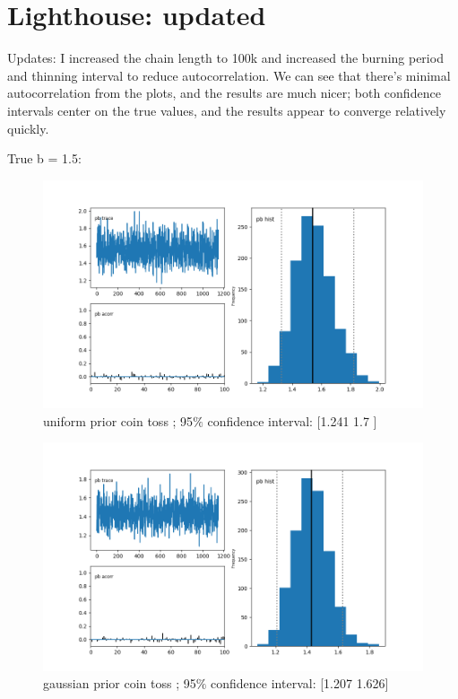 \documentclass[a4paper,11pt,english]{article}
\begin{document}
\section{Lighthouse: updated}
\par Updates: I increased the chain length to 100k and increased the burning period and thinning interval to reduce autocorrelation. We can see that there's minimal autocorrelation from the plots, and the results are much nicer; both confidence intervals center on the true values, and the results appear to converge relatively quickly.		 
\par True b = 1.5:
\begin{figure}[H]
	
	\includegraphics[width=\linewidth]{lighthouse/b_unif}
	uniform prior coin toss ;   95$\%$ confidence interval: [1.241 1.7  ]
	
	\includegraphics[width=\linewidth]{lighthouse/b_gauss}
	gaussian prior coin toss ;  95$\%$ confidence interval: 
[1.207 1.626]
	
\end{figure}
\end{document}
